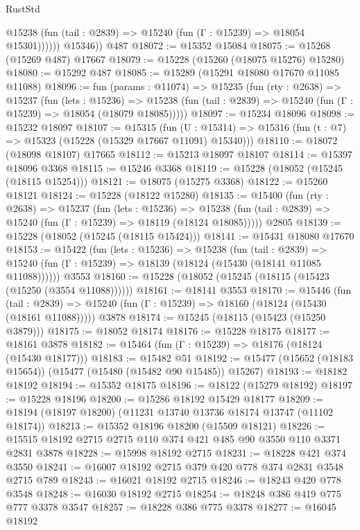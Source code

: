 \begin{lexlean}{RustStd}
\begin{coremodule}
              @15238 (fun (tail : @2839) => @15240 (fun (Γ : @15239) => @18054 @15301))))))
        @15346))
    @487
@18072 := @15352 @15084
@18075 := @15268 (@15269 @487) @17667
@18079 := @15228 (@15260 (@18075 @15276) @15280)
@18080 := @15292 @487
@18085 := @15289 (@15291 @18080 @17670 @11085 @11088)
@18096 := fun (params : @11074) =>
  @15235
    (fun (rty : @2638) =>
    @15237
      (fun (lets : @15236) =>
      @15238 (fun (tail : @2839) => @15240 (fun (Γ : @15239) => @18054 (@18079 @18085)))))
@18097 := @15234 @18096
@18098 := @15232 @18097
@18107 := @15315
    (fun (U : @15314) => @15316 (fun (t : @7) => @15323 (@15228 (@15329 @17667 @11091) @15340)))
@18110 := @18072 (@18098 @18107) @17665
@18112 := @15213 @18097 @18107
@18114 := @15397 @18096 @3368
@18115 := @15246 @3368
@18119 := @15228 (@18052 (@15245 (@18115 @15254)))
@18121 := @18075 (@15275 @3368)
@18122 := @15260 @18121
@18124 := @15228 (@18122 @15280)
@18135 := @15400
    (fun (rty : @2638) =>
    @15237
      (fun (lets : @15236) =>
      @15238 (fun (tail : @2839) => @15240 (fun (Γ : @15239) => @18119 (@18124 @18085)))))
    @2805
@18139 := @15228 (@18052 (@15245 (@18115 @15424)))
@18141 := @15431 @18080 @17670
@18153 := @15422
    (fun (lets : @15236) =>
    @15238
      (fun (tail : @2839) =>
      @15240 (fun (Γ : @15239) => @18139 (@18124 (@15430 (@18141 @11085 @11088))))))
    @3553
@18160 := @15228 (@18052 (@15245 (@18115 (@15423 (@15250 (@3554 @11088))))))
@18161 := @18141 @3553
@18170 := @15446
    (fun (tail : @2839) => @15240 (fun (Γ : @15239) => @18160 (@18124 (@15430 (@18161 @11088)))))
    @3878
@18174 := @15245 (@18115 (@15423 (@15250 @3879)))
@18175 := @18052 @18174
@18176 := @15228 @18175
@18177 := @18161 @3878
@18182 := @15464 (fun (Γ : @15239) => @18176 (@18124 (@15430 @18177)))
@18183 := @15482 @51
@18192 := @15477 (@15652 (@18183 @15654)) (@15477 (@15480 (@15482 @90 @15485)) @15267)
@18193 := @18182 @18192
@18194 := @15352 @18175
@18196 := @18122 (@15279 @18192)
@18197 := @15228 @18196
@18200 := @15286 @18192 @15429 @18177
@18209 := @18194 (@18197 @18200) (@11231 @13740 @13736 @18174 @13747 (@11102 @18174))
@18213 := @15352 @18196 @18200 (@15509 @18121)
@18226 := @15515 @18192 @2715 @2715 @110 @374 @421 @485 @90 @3550 @110 @3371 @2831 @3878
@18228 := @15998 @18192 @2715
@18231 := @18228 @421 @374 @3550
@18241 := @16007 @18192 @2715 @379 @420 @778 @374 @2831 @3548 @2715 @789
@18243 := @16021 @18192 @2715
@18246 := @18243 @420 @778 @3548
@18248 := @16030 @18192 @2715
@18254 := @18248 @386 @419 @775 @777 @3378 @3547
@18257 := @18228 @386 @775 @3378
@18277 := @16045
    @18192

\end{coremodule}
\end{lexlean}
